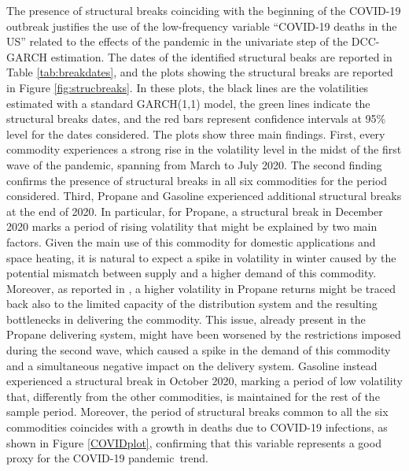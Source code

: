 \begin{paracol}{2}
The presence of structural breaks coinciding with the beginning of the COVID-19 outbreak justifies the use of the low-frequency variable ``COVID-19 deaths in the US'' related to the effects of the pandemic in the univariate step of the DCC-GARCH estimation. 
The dates of the identified structural beaks are reported in Table \ref{tab:breakdates}, and the plots showing the structural breaks are reported in Figure \ref{fig:strucbreaks}. In these plots, the black lines are the volatilities estimated with a standard GARCH(1,1) model, the green lines indicate the structural breaks dates, and the red bars represent confidence intervals at 95\% level for the dates considered. 
The plots show three main findings. First, every commodity experiences a strong rise in the volatility level in the midst of the first wave of the pandemic, spanning from March to July 2020. The second finding confirms the presence of structural breaks in all six commodities for the period considered. Third, Propane and Gasoline experienced additional structural breaks at the end of 2020. In particular, for Propane, a structural break in December 2020 marks a period of rising volatility that might be explained by two main factors. Given the main use of this commodity for domestic applications and space heating, it is natural to expect a spike in volatility in winter caused by the potential mismatch between supply and a higher demand of this commodity. Moreover, as reported in \cite{propanevol2003}, a higher volatility in Propane returns might be traced back also to the limited capacity of the distribution system and the resulting bottlenecks in delivering the commodity. This issue, already present in the Propane delivering system, might have been worsened by the restrictions imposed during the second wave, which caused a spike in the demand of this commodity and a simultaneous negative impact on the delivery system. 
Gasoline instead experienced a structural break in October 2020, marking a period of low volatility that, differently from the other commodities, is maintained for the rest of the sample period. 
Moreover, the period of structural breaks common to all the six commodities coincides with a growth in deaths due to COVID-19 infections, as shown in Figure \ref{COVIDplot}, confirming that this variable represents a good proxy for the COVID-19 pandemic~trend.

\begin{figure}[H]


\end{figure}
\end{paracol}
